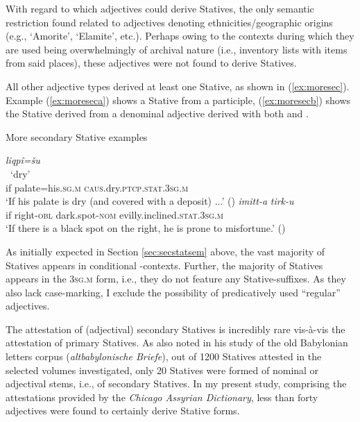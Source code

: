 \documentclass[output=paper,colorlinks,citecolor=brown]{langscibook}
\begin{document}
 With regard to which adjectives could derive Statives, the only semantic restriction found related to adjectives denoting ethnicities/geographic origins (e.g.,  `Amorite',  `Elamite', etc.). Perhaps owing to the contexts during which they are used being overwhelmingly of archival nature (i.e., inventory lists with items from said places), these adjectives were not found to derive Statives. 

All other adjective types derived at least one Stative, as shown in (\ref{ex:moresec}). Example (\ref{ex:moreseca}) shows a Stative from a participle, (\ref{ex:moresecb}) shows the Stative derived from a denominal adjective derived with both  and .

\begin{exe}  \ex More secondary Stative examples\label{ex:moresec}
\begin{xlist} \ex \label{ex:moreseca} \glll {} \textit{liqpî=šu} \textbf{}\\
    {} {} ~`dry' \\
     if palate=his.\textsc{sg.m} \textsc{caus}.dry.\textsc{ptcp.stat.3sg.m}\\
    \glt `If his palate is dry (and covered with a deposit) ...' ()
  \ex \label{ex:moresecb} \gll {} \textit{imitt-a} \textit{tirk-u} \textbf{}\\
     if right-\textsc{obl} {dark.spot}-\textsc{nom} {evilly.inclined}.\textsc{stat.3sg.m}\\
    \glt `If there is a black spot on the right, he is prone to misfortune.' ()
    \end{xlist}    
\end{exe}

 As initially expected in Section \ref{sec:secstatsem} above, the vast majority of Statives appears in conditional -contexts. Further, the majority of Statives appears in the \textsc{3sg.m} form, i.e., they do not feature any Stative-suffixes. As they also lack case-marking, I exclude the possibility of predicatively used “regular” adjectives.

The attestation of (adjectival) secondary Statives is incredibly rare vis-à-vis the attestation of primary Statives. As \citet{kraus_nominalsatze_1984} also noted in his study of the old Babylonian letters corpus (\textit{altbabylonische Briefe}), out of 1200 Statives attested in the selected volumes investigated, only 20 Statives were formed of nominal or adjectival stems, i.e., of secondary Statives. In my present study, comprising the attestations provided by the \textit{Chicago Assyrian Dictionary}, less than forty adjectives were found to certainly derive Stative forms.
\end{document}

